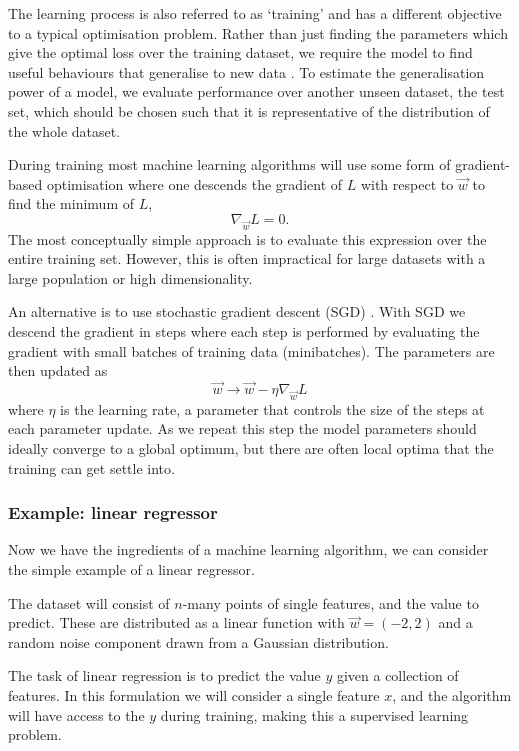 The learning process is also referred to as `training' and has a different objective to a typical optimisation problem. Rather than just finding the parameters which give the optimal loss over the training dataset, we require the model to find useful behaviours that generalise to new data \cite{DeepLearningBook}. 
To estimate the generalisation power of a model, we evaluate performance over another unseen dataset, the test set, which should be chosen such that it is representative of the distribution of the whole dataset.


During training most machine learning algorithms will use some form of gradient-based optimisation where one descends the gradient of $L$ with respect to $\vec{w}$ to find the minimum of $L$,
\begin{equation}
    \nabla_{\vec{w}}L = 0.
\end{equation}
The most conceptually simple approach is to evaluate this expression over the entire training set. However, this is often impractical for large datasets with a large population or high dimensionality. 

An alternative is to use stochastic gradient descent (SGD) \cite{DeepLearningBook}. With SGD we descend the gradient in steps where each step is performed by evaluating the gradient with small batches of training data (minibatches). 
The parameters are then updated as
\begin{equation}
    \vec{w} \rightarrow \vec{w} - \eta\nabla_{\vec{w}}L
\end{equation}
where $\eta$ is the learning rate, a parameter that controls the size of the steps at each parameter update. As we repeat this step the model parameters should ideally converge to a global optimum, but there are often local optima that the training can get settle into. 


\subsubsection{Example: linear regressor}
Now we have the ingredients of a machine learning algorithm, we can consider the simple example of a linear regressor. 

The dataset will consist of $n$-many points of single features, and the value to predict. These are distributed as a linear function with $\vec{w} = (-2,2)$ and a random noise component drawn from a Gaussian distribution.

The task of linear regression is to predict the value $y$ given a collection of features. In this formulation we will consider a single feature $x$, and the algorithm will have access to the $y$ during training, making this a supervised learning problem. 

